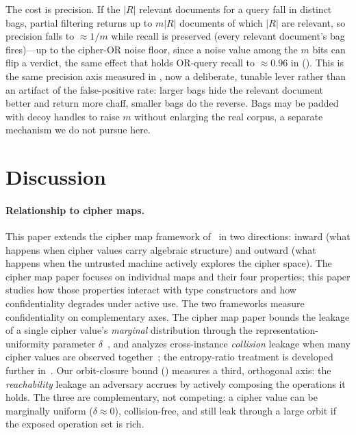 \documentclass[11pt]{article}
\theoremstyle{definition}
\theoremstyle{plain}
\theoremstyle{remark}
\begin{document}
The cost is precision.
If the $|R|$ relevant documents for a query fall in distinct bags,
partial filtering returns up to $m|R|$ documents of which $|R|$ are
relevant, so precision falls to $\approx 1/m$ while recall is preserved
(every relevant document's bag fires)---up to the cipher-OR noise floor,
since a noise value among the $m$ bits can flip a verdict, the same
effect that holds OR-query recall to $\approx 0.96$ in
 ().
This is the same precision axis measured in ,
now a deliberate, tunable lever rather than an artifact of the
false-positive rate: larger bags hide the relevant document better and
return more chaff, smaller bags do the reverse.
Bags may be padded with decoy handles to raise $m$ without enlarging the
real corpus, a separate mechanism we do not pursue here.


\section{Discussion}
\label{sec:discussion}

\paragraph{Relationship to cipher maps.}
This paper extends the cipher map framework of~\cite{towell2026cipher} in
two directions: inward (what happens when cipher values carry algebraic
structure) and outward (what happens when the untrusted machine actively
explores the cipher space).
The cipher map paper focuses on individual maps and their four properties;
this paper studies how those properties interact with type constructors and
how confidentiality degrades under active use.
The two frameworks measure confidentiality on complementary axes.
The cipher map paper bounds the leakage of a single cipher value's
\emph{marginal} distribution through the representation-uniformity
parameter $\delta$~\cite[Prop.~5.1]{towell2026cipher}, and analyzes
cross-instance \emph{collision} leakage when many cipher values are
observed together~\cite[\S 8.2]{towell2026cipher}; the entropy-ratio
treatment is developed further in~\cite{towell2026maxconf}.
Our orbit-closure bound () measures a
third, orthogonal axis: the \emph{reachability} leakage an adversary
accrues by actively composing the operations it holds.
The three are complementary, not competing: a cipher value can be
marginally uniform ($\delta \approx 0$), collision-free, and still
leak through a large orbit if the exposed operation set is rich.
\end{document}
